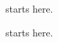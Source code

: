 \documentclass{article}
\begin{document}
\phantom{Y} starts here.

\vphantom{Z} starts here.
\end{document}
